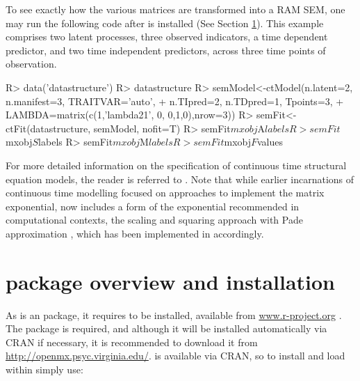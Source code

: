 \documentclass[nojss]{jss}\usepackage[]{graphicx}\usepackage[]{color}
\begin{document}
To see exactly how the various matrices are transformed into a RAM SEM, one may run the following code after  is installed (See Section \ref{sec:ctsemoverview}). This example comprises two latent processes, three observed indicators, a time dependent predictor, and two time independent predictors, across three time points of observation.

\begin{Schunk}
\begin{Sinput}
R> data('datastructure')
R> datastructure
R> semModel<-ctModel(n.latent=2, n.manifest=3, TRAITVAR='auto', 
+   n.TIpred=2, n.TDpred=1, Tpoints=3, 
+   LAMBDA=matrix(c(1,'lambda21', 0, 0,1,0),nrow=3))
R> semFit<-ctFit(datastructure, semModel, nofit=T)
R> semFit$mxobj$A$labels
R> semFit$mxobj$S$labels
R> semFit$mxobj$M$labels
R> semFit$mxobj$F$values
\end{Sinput}
\end{Schunk}

% 
% 
% 
% 
For more detailed information on the specification of continuous time structural equation models, the reader is referred to \citet{oud2000continuous, arnold1974stochastic, singer1998continuous, voelkle2012sem}. Note that while earlier incarnations of continuous time modelling focused on approaches to implement the matrix exponential,  now includes a form of the exponential recommended in computational contexts, the scaling and squaring approach with Pade approximation \citep{higham2009scaling}, which has been implemented in  accordingly.

\section[ctsem package overview and installation]{ package overview and installation} \label{sec:ctsemoverview}\nopagebreak
As  is an  package, it requires  to be installed, available from \url{www.r-project.org} \citep{rcoreteam2014r}. 
The  package  \citep{neale2015openmx} is required, and although it will be installed automatically via CRAN if necessary, it is recommended to download it from \url{http://openmx.psyc.virginia.edu/}. 
 is available via CRAN, so to install and load  within  simply use:
\end{document}
